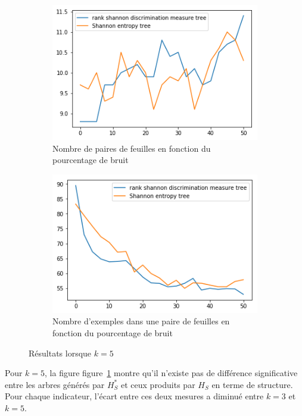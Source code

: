 \documentclass[a4paper]{article}
\newcommand{\figref}[1]{figure~\ref{#1}}
\begin{document}
\begin{figure}[H]
    \begin{subfigure}[c]{0.46\textwidth}
        \centering
        \includegraphics[width=\textwidth]{images/nbpairs_5.png}
        \caption{Nombre de paires de feuilles en fonction du pourcentage de bruit}
    \end{subfigure}
    \begin{subfigure}[c]{0.46\textwidth}
        \centering
        \includegraphics[width=\textwidth]{images/nbexamples_5.png}
        \caption{Nombre d'exemples dans une paire de feuilles en fonction du pourcentage de bruit}
    \end{subfigure}

    \caption{Résultats lorsque $k=5$}
    \label{results:artificial5}
\end{figure}

Pour $k=5$, la figure \figref{results:artificial5} montre qu'il n'existe pas de
différence significative entre les arbres générés par $H^*_S$ et ceux produits
par $H_S$ en terme de structure. Pour chaque indicateur, l'écart entre ces deux
mesures a diminué entre $k=3$ et $k=5$.
\end{document}
